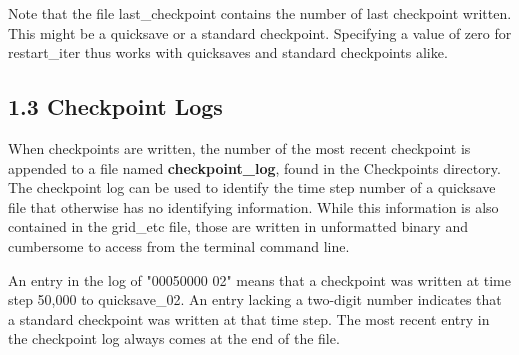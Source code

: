 Note that the file last\_checkpoint contains the number of last checkpoint written.  This might be a quicksave or a standard checkpoint.  Specifying a value of zero for restart\_iter thus works with quicksaves and standard checkpoints alike.    

\subsection{1.3 Checkpoint Logs}
When checkpoints are written, the number of the most recent checkpoint is appended to a file named \textbf{checkpoint\_log}, found in the Checkpoints directory.   The checkpoint log can be used to identify  the time step number of a quicksave file that otherwise has no identifying information.  While this information is also contained in the grid\_etc file, those are written in unformatted binary and cumbersome to access from the terminal command line.

An entry in the log of "00050000 02" means that a checkpoint was written at time step 50,000 to quicksave\_02.  An entry lacking a two-digit number indicates that a standard checkpoint was written at that time step.  The most recent entry in the checkpoint log always comes at the end of the file.
